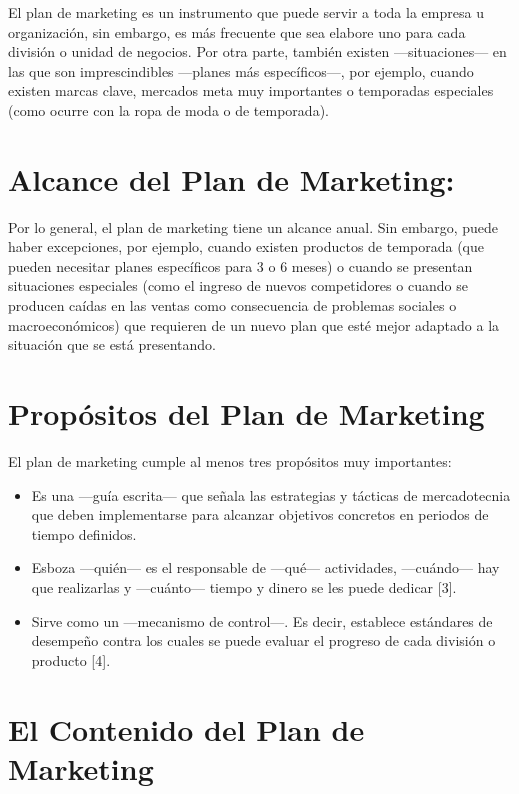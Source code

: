 \documentclass[
]{book}
\providecommand{\tightlist}{%
  \setlength{\itemsep}{0pt}\setlength{\parskip}{0pt}}
\begin{document}
El plan de marketing es un instrumento que puede servir a toda la empresa u organización, sin embargo, es más frecuente que sea elabore uno para cada división o unidad de negocios. Por otra parte, también existen ---situaciones--- en las que son imprescindibles ---planes más específicos---, por ejemplo, cuando existen marcas clave, mercados meta muy importantes o temporadas especiales (como ocurre con la ropa de moda o de temporada).

\hypertarget{alcance-del-plan-de-marketing}{%
\section{Alcance del Plan de Marketing:}\label{alcance-del-plan-de-marketing}}

Por lo general, el plan de marketing tiene un alcance anual. Sin embargo, puede haber excepciones, por ejemplo, cuando existen productos de temporada (que pueden necesitar planes específicos para 3 o 6 meses) o cuando se presentan situaciones especiales (como el ingreso de nuevos competidores o cuando se producen caídas en las ventas como consecuencia de problemas sociales o macroeconómicos) que requieren de un nuevo plan que esté mejor adaptado a la situación que se está presentando.

\hypertarget{propuxf3sitos-del-plan-de-marketing}{%
\section{Propósitos del Plan de Marketing}\label{propuxf3sitos-del-plan-de-marketing}}

El plan de marketing cumple al menos tres propósitos muy importantes:

\begin{itemize}
\tightlist
\item
  Es una ---guía escrita--- que señala las estrategias y tácticas de mercadotecnia que deben implementarse para alcanzar objetivos concretos en periodos de tiempo definidos.
\item
  Esboza ---quién--- es el responsable de ---qué--- actividades, ---cuándo--- hay que realizarlas y ---cuánto--- tiempo y dinero se les puede dedicar {[}3{]}.
\item
  Sirve como un ---mecanismo de control---. Es decir, establece estándares de desempeño contra los cuales se puede evaluar el progreso de cada división o producto {[}4{]}.
\end{itemize}

\hypertarget{el-contenido-del-plan-de-marketing}{%
\section{El Contenido del Plan de Marketing}\label{el-contenido-del-plan-de-marketing}}
\end{document}
